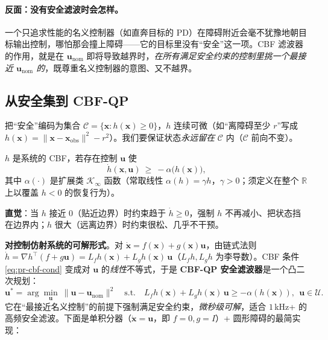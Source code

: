 \paragraph{反面：没有安全滤波时会怎样。}
一个只追求性能的名义控制器（如直奔目标的 PD）在障碍附近会毫不犹豫地朝目标输出控制，哪怕那会撞上障碍——它的目标里没有“安全”这一项。CBF 滤波器的作用，就是在 $\mathbf{u}_{\mathrm{nom}}$ 即将导致越界时，\emph{在所有满足安全约束的控制里挑一个最接近 $\mathbf{u}_{\mathrm{nom}}$ 的}，既尊重名义控制器的意图、又不越界。

\subsection{从安全集到 CBF-QP}
\label{sec:pr-cbf-qp}

把“安全”编码为集合 $\mathcal{C}=\{\mathbf{x}:h(\mathbf{x})\ge 0\}$，$h$ 连续可微（如“离障碍至少 $r$”写成 $h(\mathbf{x})=\|\mathbf{x}-\mathbf{x}_{\mathrm{obs}}\|^2-r^2$）。我们要保证状态\emph{永远留在} $\mathcal{C}$ 内（$\mathcal{C}$ 前向不变）。

\begin{definition}[控制屏障函数条件]\label{def:pr-cbf}
$h$ 是系统的 CBF，若存在控制 $\mathbf{u}$ 使
\begin{equation}
  \dot{h}(\mathbf{x},\mathbf{u})\ \ge\ -\alpha\big(h(\mathbf{x})\big),
  \label{eq:pr-cbf-cond}
\end{equation}
其中 $\alpha(\cdot)$ 是扩展类 $\mathcal{K}_\infty$ 函数（常取线性 $\alpha(h)=\gamma h$，$\gamma>0$；须定义在整个 $\mathbb{R}$ 上以覆盖 $h<0$ 的恢复行为）。
\end{definition}
\textbf{直觉}：当 $h$ 接近 0（贴近边界）时约束趋于 $\dot h\ge0$，强制 $h$ 不再减小、把状态挡在边界内；$h$ 很大（远离边界）时约束很松、几乎不干预\cite{ames2017cbf,ames2019cbf}。

\textbf{对控制仿射系统的可解形式}。对 $\dot{\mathbf{x}}=f(\mathbf{x})+g(\mathbf{x})\mathbf{u}$，由链式法则 $\dot h=\nabla h^\top(f+g\mathbf{u})=L_f h(\mathbf{x})+L_g h(\mathbf{x})\,\mathbf{u}$（$L_f h,L_g h$ 为李导数）。CBF 条件 \cref{eq:pr-cbf-cond} 变成对 $\mathbf{u}$ 的\emph{线性}不等式，于是 \textbf{CBF-QP 安全滤波器}是一个凸二次规划：
\begin{equation}
  \mathbf{u}^*=\arg\min_{\mathbf{u}}\ \|\mathbf{u}-\mathbf{u}_{\mathrm{nom}}\|^2\quad\text{s.t.}\quad L_f h(\mathbf{x})+L_g h(\mathbf{x})\,\mathbf{u}\ge-\alpha(h(\mathbf{x})),\ \ \mathbf{u}\in\mathcal{U}.
  \label{eq:pr-cbf-qp}
\end{equation}
它在“最接近名义控制”的前提下强制满足安全约束，\emph{微秒级可解}，适合 $1\,$kHz+ 的高频安全滤波。下面是单积分器（$\dot{\mathbf{x}}=\mathbf{u}$，即 $f=0,g=I$）+ 圆形障碍的最简实现：

